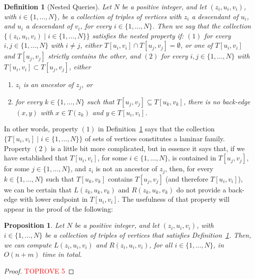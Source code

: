 \documentclass[11pt,a4paper]{article}
\newtheorem{proposition}[theorem]{Proposition}
\newtheorem{definition}[theorem]{Definition}
\begin{document}
\begin{definition}[Nested Queries]
\label{definition:nestedqueries}
\normalfont
Let $N$ be a positive integer, and let $(z_i,u_i,v_i)$, with $i\in\{1,\dots,N\}$, be a collection of triples of vertices with $z_i$ a descendant of $u_i$, and $u_i$ a descendant of $v_i$, for every $i\in\{1,\dots,N\}$. Then we say that the collection $\{(z_i,u_i,v_i)\mid i\in\{1,\dots,N\}\}$ satisfies the nested property if: $(1)$ for every $i,j\in\{1,\dots,N\}$ with $i\neq j$, either $T[u_i,v_i]\cap T[u_j,v_j]=\emptyset$, or one of $T[u_i,v_i]$ and $T[u_j,v_j]$ strictly contains the other, and $(2)$ for every $i,j\in\{1,\dots,N\}$ with $T[u_i,v_i]\subset T[u_j,v_j]$, either
\begin{enumerate}[label={(\roman*)}]
\item{$z_i$ is an ancestor of $z_j$, or}
\item{for every $k\in\{1,\dots,N\}$ such that $T[u_j,v_j]\subseteq T[u_k,v_k]$, there is no back-edge $(x,y)$ with $x\in T(z_k)$ and $y\in T[u_i,v_i]$.}
\end{enumerate}
\end{definition}

In other words, property $(1)$ in Definition~\ref{definition:nestedqueries} says that the collection $\{T[u_i,v_i]\mid i\in\{1,\dots,N\}\}$ of sets of vertices constitutes a laminar family. Property $(2)$ is a little bit more complicated, but in essence it says that, if we have established that $T[u_i,v_i]$, for some $i\in\{1,\dots,N\}$, is contained in $T[u_j,v_j]$, for some $j\in\{1,\dots,N\}$, and $z_i$ is not an ancestor of $z_j$, then, for every $k\in\{1,\dots,N\}$ such that $T[u_k,v_k]$ contains $T[u_j,v_j]$ (and therefore $T[u_i,v_i]$), we can be certain that $L(z_k,u_k,v_k)$ and $R(z_k,u_k,v_k)$ do not provide a back-edge with lower endpoint in $T[u_i,v_i]$. The usefulness of that property will appear in the proof of the following: 

\begin{proposition}
\label{proposition:leftmostinsegment}
Let $N$ be a positive integer, and let $(z_i,u_i,v_i)$, with $i\in\{1,\dots,N\}$ be a collection of triples of vertices that satisfies Definition~\ref{definition:nestedqueries}. Then, we can compute $L(z_i,u_i,v_i)$ and $R(z_i,u_i,v_i)$, for all $i\in\{1,\dots,N\}$, in $O(n+m)$ time in total.
\end{proposition}
\begin{proof}\textcolor{red}{TOPROVE 5}\end{proof} 
\end{document}
